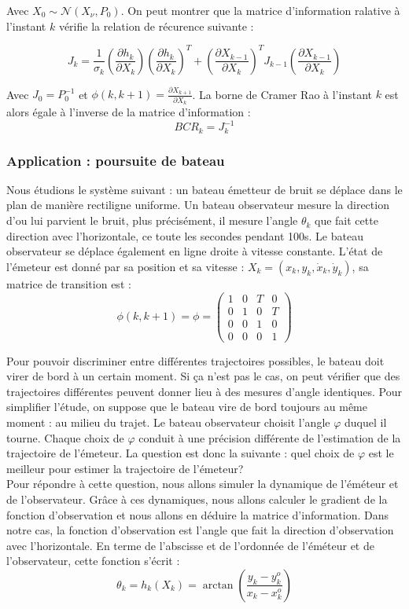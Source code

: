 \documentclass{article}
\begin{document}
Avec $X_{0} \sim  \mathcal{N} (X_{\nu},P_{0})$. On peut montrer que la matrice d'information ralative à l'instant $k$ vérifie
la relation de récurence suivante : 

\[ J_{k} = \frac{1}{\sigma_{k}}\left(\frac{\partial h_{k}}{\partial X_{k}}\right)\left(\frac{\partial h_{k}}{\partial X_{k}}\right)^{T}+\left(\frac{\partial X_{k-1}}{\partial X_{k}}\right)^{T}J_{k-1}\left(\frac{\partial X_{k-1}}{\partial X_{k}}\right)\]

Avec $J_{0}=P_{0}^{-1}$ et $\phi(k,k+1)=\frac{\partial X_{k+1}}{\partial X_{k}}$.
La borne de Cramer Rao à l'instant $k$ est alors égale à l'inverse de la matrice d'information : 
\[BCR_{k}= J_{k}^{-1}\]

\subsubsection{Application : poursuite de bateau}
Nous étudions le système suivant : un bateau émetteur de bruit se déplace dans le plan de manière rectiligne uniforme. 
Un bateau observateur mesure la direction d'ou lui parvient le bruit, plus précisément, il mesure l'angle $\theta_{k}$ que fait cette direction avec l'horizontale, ce toute les secondes pendant 100s. Le bateau observateur se déplace également en ligne droite à vitesse constante.
L'état de l'émeteur est donné par sa position et sa vitesse : $X_{k} = (x_{k},y_{k},\dot{x}_{k},\dot{y}_{k})$, sa matrice de transition est :
\[\phi(k,k+1) = \phi =  \begin{pmatrix}
  1 & 0 & T & 0 \\
  0 & 1 & 0 & T \\
  0 & 0 & 1 & 0 \\
  0 & 0 & 0 & 1 
  \end{pmatrix}\]

Pour pouvoir discriminer entre différentes
trajectoires possibles, le bateau doit virer de bord à un certain moment. Si ça n'est pas le cas, on peut vérifier que des trajectoires différentes peuvent donner lieu à des mesures d'angle identiques.
Pour simplifier l'étude, on suppose que le bateau vire de bord toujours au même moment : au milieu du trajet. Le bateau observateur choisit l'angle $\varphi $ duquel il tourne. Chaque choix de $\varphi$ 
conduit à une précision différente de l'estimation de la trajectoire  de l'émeteur.
La question est donc la suivante : quel choix de $\varphi$ est le meilleur pour estimer la trajectoire de l'émeteur?
\\
Pour répondre à cette question, nous allons simuler la dynamique de l'éméteur et de l'observateur. Grâce à ces dynamiques, nous allons
calculer le gradient de la fonction d'observation et nous allons en déduire la matrice d'information.
Dans notre cas, la fonction d'observation est l'angle que fait la direction d'observation avec l'horizontale. 
En terme de l'abscisse et de l'ordonnée de l'éméteur et de l'observateur, cette fonction s'écrit : 
\[\theta_{k} = h_{k}(X_{k})=\arctan \left(\frac{y_{k}-y_{k}^{o}}{x_{k}-x_{k}^{o}}\right)\]
\end{document}
